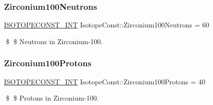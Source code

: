 \subsubsection{\texorpdfstring{Zirconium100\+Neutrons}{Zirconium100Neutrons}}
{\footnotesize\ttfamily \mbox{\hyperlink{group___isotope_const-_macros_ga5f18360b3e99483a35c32d789e62621c}{I\+S\+O\+T\+O\+P\+E\+C\+O\+N\+S\+T\+\_\+\+I\+NT}} Isotope\+Const\+::\+Zirconium100\+Neutrons = 60}

\$ \$ Neutrons in Zirconium-\/100. \mbox{\label{group___isotope_const-_zirconium-_zr100_ga0726422a8dac90f1f7926c99523cae34}} 
\subsubsection{\texorpdfstring{Zirconium100\+Protons}{Zirconium100Protons}}
{\footnotesize\ttfamily \mbox{\hyperlink{group___isotope_const-_macros_ga5f18360b3e99483a35c32d789e62621c}{I\+S\+O\+T\+O\+P\+E\+C\+O\+N\+S\+T\+\_\+\+I\+NT}} Isotope\+Const\+::\+Zirconium100\+Protons = 40}

\$ \$ Protons in Zirconium-\/100. 